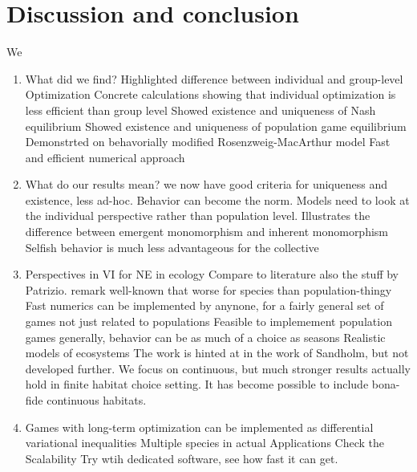 \section{Discussion and conclusion}
We


\begin{enumerate}
  \item What did we find?
    Highlighted difference between individual and group-level Optimization
    Concrete calculations showing that individual optimization is less efficient than group level
    Showed existence and uniqueness of Nash equilibrium
    Showed existence and uniqueness of population game equilibrium
    Demonstrted on behavorially modified Rosenzweig-MacArthur model
    Fast and efficient numerical approach
  \item What do our results mean?
    we now have good criteria for uniqueness and existence, less ad-hoc.
    Behavior can become the norm.
    Models need to look at the individual perspective rather than population level.
    Illustrates the difference between emergent monomorphism and inherent monomorphism
    Selfish behavior is much less advantageous for the collective

  \item Perspectives in VI for NE in ecology  Compare to literature also the stuff by Patrizio. remark well-known that worse for species than population-thingy
    Fast numerics can be implemented by anynone, for a fairly general set of games not just related to populations
    Feasible to implemement population games generally, behavior can be as much of a choice as seasons
    Realistic models of ecosystems
    The work is hinted at in the work of Sandholm, but not developed further.
    We focus on continuous, but much stronger results actually hold in finite habitat choice setting.
    It has become possible to include bona-fide continuous habitats. 
  \item
    Games with long-term optimization can be implemented as differential variational inequalities
    Multiple species in actual Applications
    Check the Scalability
    Try wtih dedicated software, see how fast it can get.

\end{enumerate}
